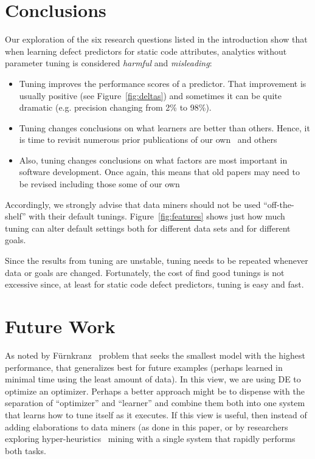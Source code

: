 \documentclass{sig-alternative}
\newcommand{\bi}{\begin{itemize}[leftmargin=0.4cm]}
\newcommand{\ei}{\end{itemize}}
\newcommand{\fig}[1]{Figure~\ref{fig:#1}}
\begin{document}
\section{Conclusions}

Our exploration of the six research
questions listed in the introduction
show that when learning defect predictors for static code
attributes,   analytics without parameter tuning is considered {\em harmful} and {\em misleading}:
\bi
\item Tuning improves the performance scores of a predictor.
That improvement is usually positive (see \fig{deltas}) and sometimes
it can be quite   dramatic (e.g. precision changing from 2\% to 98\%). \item 
Tuning changes conclusions on what learners are better than others.
Hence, it is time to revisit numerous prior publications of our own~
and others~
\item
Also,
tuning changes conclusions on what factors are most important in software development.
Once again, this means that old papers may need to be revised including those
some of our own~
\ei
Accordingly, we strongly advise that data miners should not be used ``off-the-shelf'' with their default tunings. 
\fig{features} shows just how much tuning can alter default settings
both for different data sets and for different goals. 

Since the results from tuning are unstable,
tuning needs to be repeated
whenever data or goals are changed.
Fortunately, the cost of find good tunings is not excessive since, at least for
static code defect predictors, tuning is easy and fast.

\section{Future Work}

 As noted by
F\"{u}rnkranz~
problem that seeks the smallest model with the highest performance, 
that generalizes best for
future examples (perhaps learned in minimal time using the least amount of data).
In this view, we are using DE to optimize an optimizer. Perhaps a better approach might be
to dispense with the separation of ``optimizer'' and ``learner'' and combine them both
into one system that learns how to tune itself as it executes. If this view is useful,
then instead of adding elaborations to data miners (as done in this paper, or by researchers
exploring hyper-heuristics~
mining with a single system that rapidly performs both tasks.
\end{document}
